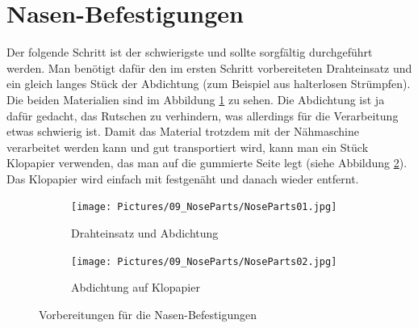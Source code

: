 \documentclass[12pt,parskip=full]{scrartcl}
\begin{document}
\section{Nasen-Befestigungen}
Der folgende Schritt ist der schwierigste und sollte sorgfältig durchgeführt werden. Man benötigt dafür den im ersten Schritt vorbereiteten Drahteinsatz und ein gleich langes Stück der Abdichtung (zum Beispiel aus halterlosen Strümpfen). Die beiden Materialien sind im Abbildung \ref{Nose01} zu sehen. Die Abdichtung ist ja dafür gedacht, das Rutschen zu verhindern, was allerdings für die Verarbeitung etwas schwierig ist. Damit das Material trotzdem mit der Nähmaschine verarbeitet werden kann und gut transportiert wird, kann man ein Stück Klopapier verwenden, das man auf die gummierte Seite legt (siehe Abbildung \ref{Nose02}). Das Klopapier wird einfach mit festgenäht und danach wieder entfernt.

\begin{figure}[ht]
    \vspace{0.5cm}
    \centering
    \begin{subfigure}{0.48\textwidth}
        \centering
        \texttt{[image: Pictures/09\_NoseParts/NoseParts01.jpg]}
        \caption{Drahteinsatz und Abdichtung}
        \label{Nose01}
    \end{subfigure}
    \begin{subfigure}{0.48\textwidth}
        \centering
        \texttt{[image: Pictures/09\_NoseParts/NoseParts02.jpg]}
        \caption{Abdichtung auf Klopapier}
        \label{Nose02}
    \end{subfigure}
    \caption{Vorbereitungen für die Nasen-Befestigungen}
    \label{NosePrep}
\end{figure}
\end{document}
